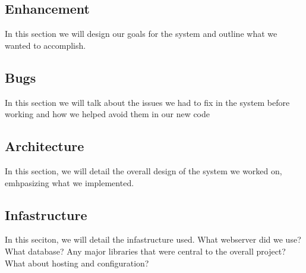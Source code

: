 \subsection{Enhancement}
\label{sec:enhancement}
In this section we will design our goals for the system and outline what we
wanted to accomplish.

\subsection{Bugs}
\label{sec:bugs}
In this section we will talk about the issues we had to fix in the system before
working and how we helped avoid them in our new code

\subsection{Architecture}
\label{sec:architecture}
In this section, we will detail the overall design of the system we worked on,
emhpasizing what we implemented.

\subsection{Infastructure}
\label{sec:infastructure}
In this seciton, we will detail the infastructure used.  What webserver did we
use?  What database?  Any major libraries that were central to the overall
project?  What about hosting and configuration?


